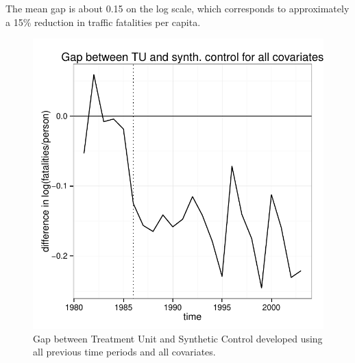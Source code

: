 \documentclass[letterpaper, 12pt]{article}
\begin{document}
The mean gap is about 0.15 on the log scale, which corresponds to approximately a 15\% reduction in traffic fatalities per capita. 

\begin{figure}[htbp]
\begin{center}
\includegraphics{img-gap-full.pdf}
\caption{Gap between Treatment Unit and Synthetic Control developed using all previous time periods and all covariates.}
\label{fig:c11}
\end{center}
\end{figure}
\end{document}
